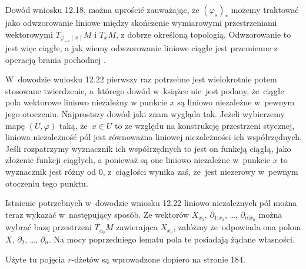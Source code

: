 \documentclass[a4paper,11pt]{article}
\begin{document}
\vspace{\spaceFour}





\noindent
{} Dowód wniosku 12.18, można uprościć zauważając, że
$( \varphi_{ s } )_{ * }$ możemy traktować jako odwzorowanie
liniowe między skończenie wymiarowymi przestrzeniami wektorowymi
$T_{ \varphi_{ -s }( x ) }M$ i $T_{ x }M$, z dobrze określoną
topologią. Odwzorowanie to jest więc ciągłe, a jak wiemy
odwzorowanie liniowe ciągłe jest przemienne z operacją brania
pochodnej \cite{LSKAMI}.

\vspace{\spaceFour}





\noindent
{} W~dowodzie wniosku 12.22 pierwszy raz potrzebne jest
wielokrotnie potem stosowane twierdzenie, a~którego dowód w~książce
nie~jest podany, że~ciągłe pola wektorowe liniowo niezależny w punkcie
$x$ są liniowo niezależne w~pewnym jego otoczeniu. Najprostszy dowód
jaki znam wygląda tak. Jeżeli wybierzemy mapę $( U, \varphi )$ taką,
że~$x \in U$ to ze względu na konstrukcję przestrzeni stycznej,
liniowa niezależność pól jest równoważna liniowej niezależności ich
współrzędnych. Jeśli rozpatrzymy wyznacznik ich współrzędnych to jest
on funkcją ciągłą, jako złożenie funkcji ciągłych, a ponieważ są one
liniowo niezależne w~punkcie $x$ to wyznacznik jest różny od 0,
z~ciągłości wynika zaś, że~jest niezerowy w~pewnym otoczeniu tego
punktu.

\vspace{\spaceFour}





\noindent
{} Istnienie potrzebnych w~dowodzie wniosku 12.22 liniowo
niezależnych pól można teraz wykazać w~następujący sposób. Ze
wektorów $X_{ x_{ 0 } }$, $\partial_{ 1 | { x_{ 0 } } }$, \ldots,
$\partial_{ n | { x_{ 0 } } }$ można wybrać bazę przestrzeni
$T_{ { x_{ 0 } } }M$ zawierająca $X_{ { x_{ 0 } } }$, załóżmy
że~odpowiada ona polom $X$, $\partial_{ 2 }$, \ldots,
$\partial_{ n }$. Na mocy poprzedniego lematu pola te posiadają żądane
własności.

\vspace{\spaceFour}





\noindent
{} Użyte tu pojęcia $r$-dżetów są wprowadzone dopiero na stronie 184.
\end{document}
